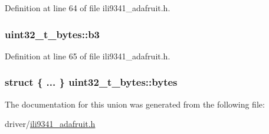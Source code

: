 Definition at line 64 of file ili9341\+\_\+adafruit.\+h.

\subsubsection[{\texorpdfstring{b3}{b3}}]{ uint32\+\_\+t\+\_\+bytes\+::b3}\hypertarget{unionuint32__t__bytes_abd7739cae59fab7cf712d53f337b378a}{}\label{unionuint32__t__bytes_abd7739cae59fab7cf712d53f337b378a}


Definition at line 65 of file ili9341\+\_\+adafruit.\+h.

\subsubsection[{\texorpdfstring{bytes}{bytes}}]{\setlength{\rightskip}{0pt plus 5cm}struct \{ ... \}   uint32\+\_\+t\+\_\+bytes\+::bytes}\hypertarget{unionuint32__t__bytes_a50aeebe398ee3b740421f1cc8d8583b8}{}\label{unionuint32__t__bytes_a50aeebe398ee3b740421f1cc8d8583b8}


The documentation for this union was generated from the following file\+:\begin{DoxyCompactItemize}
\item 
driver/\hyperlink{ili9341__adafruit_8h}{ili9341\+\_\+adafruit.\+h}\end{DoxyCompactItemize}
